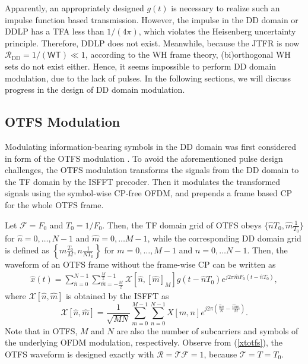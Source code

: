 \documentclass[journal]{IEEEtran}
\begin{document}
Apparently, an appropriately designed $g(t)$ is necessary to realize such an impulse function based transmission. However, the impulse in the DD domain or DDLP has a TFA less than $1/(4\pi)$, {which violates} the Heisenberg uncertainty principle. Therefore, DDLP does not exist\cite{hadaniyt}. Meanwhile, because the JTFR is now $\mathcal R_{\textrm{DD}}=1/(\mathsf W \mathsf T)\ll 1$, according to the WH frame theory, (bi)orthogonal WH sets do not exist either. Hence, it seems impossible to perform DD domain modulation, due to the lack of pulses.
In the following sections, we will discuss progress in the design of DD domain modulation.

\subsection{OTFS Modulation}
Modulating information-bearing symbols in the DD domain was first considered in form of the OTFS modulation \cite{otfs_wcnc_2017,hadani_otfs_2018}.
To avoid the aforementioned pulse design challenges, the OTFS modulation transforms the signals from the DD domain to the TF domain by the ISFFT precoder. Then it modulates the transformed {signals} using the symbol-wise CP-free OFDM, and prepends a frame based CP for the whole OTFS frame.  

Let $\mathcal F=F_0$ and $T_0=1/F_0$. Then, the TF domain grid of OTFS obeys $\{\hat nT_0,\hat m\frac{1}{T_0}\}$ for $\hat n=0,\ldots,N-1$ and $\hat m=0,\ldots M-1$, while the corresponding DD domain grid is defined as $\left\{m\frac{T_0}{M}, n\frac{1}{NT_0}\right\}$ for $m=0,\ldots,M-1$ and $n=0,\ldots N-1$.
Then, the waveform of an OTFS frame without the frame-wise CP can be written as\cite{otfs_wcnc_2017}
\begin{align}\label{xtotfs}
  \hat x(t)=\sum_{\hat n=0}^{N-1}\sum_{\hat m=-\frac{M}{2}}^{\frac{M}{2}-1} \mathcal X[\hat n,[\hat m]_M] g(t-\hat nT_0)e^{j2\pi \hat m F_0 (t-\hat n T_0)},
\end{align}
where %
$\mathcal X[\hat n,\hat m]$ is obtained by the ISFFT as
\begin{equation}\label{isfft}
  \mathcal X[\hat n,\hat m] = \frac{1}{\sqrt{MN}} \sum_{m=0}^{M-1} \sum_{n=0}^{N-1} X[m,n]e^{j2\pi(\frac{\hat n n}{N}-\frac{\hat mm}{M})}.
\end{equation}
Note that in OTFS, $M$ and $N$ are also {the number of subcarriers and symbols of the underlying OFDM modulation}, respectively. 
Observe from (\ref{xtotfs}), the OTFS waveform is designed exactly with $\mathcal R=\mathcal T \mathcal F=1$, because $\mathcal T= T=T_0$.
\end{document}
